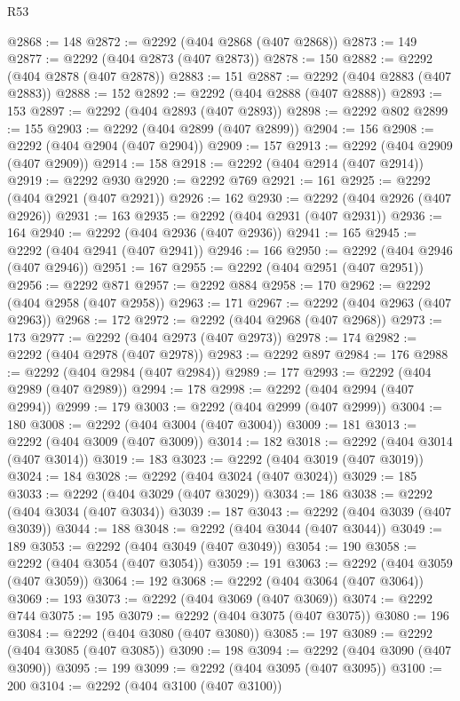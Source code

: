 \begin{lexlean}{R53}
\begin{coremodule}
@2868 := 148
@2872 := @2292 (@404 @2868 (@407 @2868))
@2873 := 149
@2877 := @2292 (@404 @2873 (@407 @2873))
@2878 := 150
@2882 := @2292 (@404 @2878 (@407 @2878))
@2883 := 151
@2887 := @2292 (@404 @2883 (@407 @2883))
@2888 := 152
@2892 := @2292 (@404 @2888 (@407 @2888))
@2893 := 153
@2897 := @2292 (@404 @2893 (@407 @2893))
@2898 := @2292 @802
@2899 := 155
@2903 := @2292 (@404 @2899 (@407 @2899))
@2904 := 156
@2908 := @2292 (@404 @2904 (@407 @2904))
@2909 := 157
@2913 := @2292 (@404 @2909 (@407 @2909))
@2914 := 158
@2918 := @2292 (@404 @2914 (@407 @2914))
@2919 := @2292 @930
@2920 := @2292 @769
@2921 := 161
@2925 := @2292 (@404 @2921 (@407 @2921))
@2926 := 162
@2930 := @2292 (@404 @2926 (@407 @2926))
@2931 := 163
@2935 := @2292 (@404 @2931 (@407 @2931))
@2936 := 164
@2940 := @2292 (@404 @2936 (@407 @2936))
@2941 := 165
@2945 := @2292 (@404 @2941 (@407 @2941))
@2946 := 166
@2950 := @2292 (@404 @2946 (@407 @2946))
@2951 := 167
@2955 := @2292 (@404 @2951 (@407 @2951))
@2956 := @2292 @871
@2957 := @2292 @884
@2958 := 170
@2962 := @2292 (@404 @2958 (@407 @2958))
@2963 := 171
@2967 := @2292 (@404 @2963 (@407 @2963))
@2968 := 172
@2972 := @2292 (@404 @2968 (@407 @2968))
@2973 := 173
@2977 := @2292 (@404 @2973 (@407 @2973))
@2978 := 174
@2982 := @2292 (@404 @2978 (@407 @2978))
@2983 := @2292 @897
@2984 := 176
@2988 := @2292 (@404 @2984 (@407 @2984))
@2989 := 177
@2993 := @2292 (@404 @2989 (@407 @2989))
@2994 := 178
@2998 := @2292 (@404 @2994 (@407 @2994))
@2999 := 179
@3003 := @2292 (@404 @2999 (@407 @2999))
@3004 := 180
@3008 := @2292 (@404 @3004 (@407 @3004))
@3009 := 181
@3013 := @2292 (@404 @3009 (@407 @3009))
@3014 := 182
@3018 := @2292 (@404 @3014 (@407 @3014))
@3019 := 183
@3023 := @2292 (@404 @3019 (@407 @3019))
@3024 := 184
@3028 := @2292 (@404 @3024 (@407 @3024))
@3029 := 185
@3033 := @2292 (@404 @3029 (@407 @3029))
@3034 := 186
@3038 := @2292 (@404 @3034 (@407 @3034))
@3039 := 187
@3043 := @2292 (@404 @3039 (@407 @3039))
@3044 := 188
@3048 := @2292 (@404 @3044 (@407 @3044))
@3049 := 189
@3053 := @2292 (@404 @3049 (@407 @3049))
@3054 := 190
@3058 := @2292 (@404 @3054 (@407 @3054))
@3059 := 191
@3063 := @2292 (@404 @3059 (@407 @3059))
@3064 := 192
@3068 := @2292 (@404 @3064 (@407 @3064))
@3069 := 193
@3073 := @2292 (@404 @3069 (@407 @3069))
@3074 := @2292 @744
@3075 := 195
@3079 := @2292 (@404 @3075 (@407 @3075))
@3080 := 196
@3084 := @2292 (@404 @3080 (@407 @3080))
@3085 := 197
@3089 := @2292 (@404 @3085 (@407 @3085))
@3090 := 198
@3094 := @2292 (@404 @3090 (@407 @3090))
@3095 := 199
@3099 := @2292 (@404 @3095 (@407 @3095))
@3100 := 200
@3104 := @2292 (@404 @3100 (@407 @3100))

\end{coremodule}
\end{lexlean}
